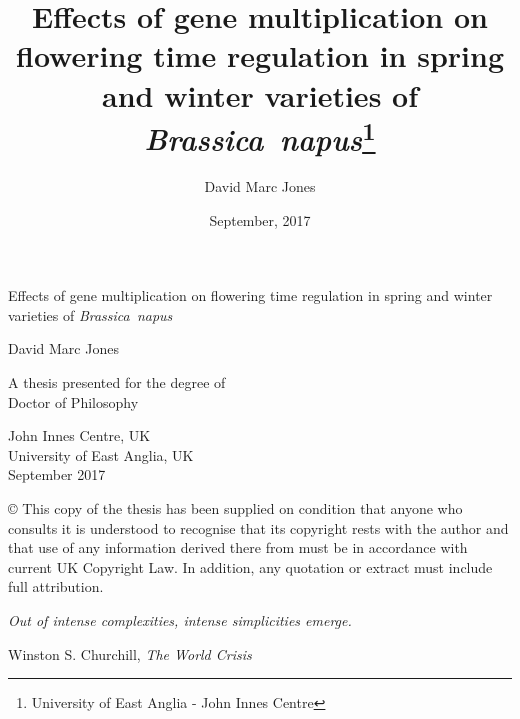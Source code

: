\documentclass[12pt,]{book}
\title{Effects of gene multiplication on flowering time regulation in spring
and winter varieties of \emph{Brassica~napus}\thanks{University of East Anglia - John Innes Centre}}
\author{David Marc Jones}
\date{September, 2017}
\begin{document}
\begin{titlepage}
    \begin{center}

        \vspace*{1.5cm}

        \huge
        Effects of gene multiplication on flowering time regulation in spring
        and winter varieties of \emph{Brassica~napus}

        \vspace{1.5cm}

        \Large
        David Marc Jones

        \vspace{1.5cm}

        \normalsize
        A thesis presented for the degree of\\
        Doctor of Philosophy
        \vfill


        \normalsize
        John Innes Centre, UK\\
        University of East Anglia, UK\\
        September 2017

        \vspace{1.5cm}

        © This copy of the thesis has been supplied on condition that anyone who consults it is understood to recognise that its copyright rests with the author and that use of any information derived there from must be in accordance with current UK Copyright Law. In addition, any quotation or extract must include full attribution.

    \end{center}

\end{titlepage}

\clearpage
\vspace*{\fill}
\epigraph{\itshape Out of intense complexities, intense simplicities emerge.}{Winston S. Churchill, \textit{The World Crisis}}
\vspace*{\fill}

{
\setcounter{tocdepth}{2}
\tableofcontents
}
\cleardoublepage
{}
\listoftables
\cleardoublepage
{}
\listoffigures
\end{document}

